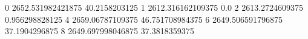 0 2652.531982421875 40.2158203125
1 2612.316162109375 0.0
2 2613.2724609375 0.956298828125
4 2659.06787109375 46.751708984375
6 2649.506591796875 37.1904296875
8 2649.697998046875 37.3818359375
